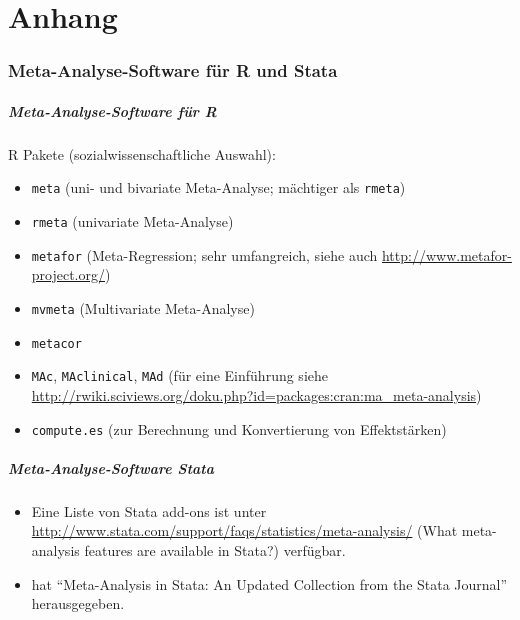 \part{Anhang}\label{part:anhang}
\frame{\partpage}



\section{Meta-Analyse-Software für R und Stata}

\begin{frame}\frametitle{Meta-Analyse-Software für R}
  R Pakete (sozialwissenschaftliche Auswahl):
  \begin{itemize}
  \item \texttt{meta} (uni- und bivariate Meta-Analyse; mächtiger als \texttt{rmeta})
  \item \texttt{rmeta} (univariate Meta-Analyse)
  \item \texttt{metafor} (Meta-Regression; sehr umfangreich, siehe auch \url{http://www.metafor-project.org/})
  \item \texttt{mvmeta} (Multivariate Meta-Analyse)
  \item \texttt{metacor}
  \item \texttt{MAc}, \texttt{MAclinical}, \texttt{MAd} (für eine Einführung
    siehe
    \url{http://rwiki.sciviews.org/doku.php?id=packages:cran:ma_meta-analysis})
  \item \texttt{compute.es} (zur Berechnung und Konvertierung von Effektstärken)
  \end{itemize}
\end{frame}



\begin{frame}\frametitle{Meta-Analyse-Software Stata}

  \begin{itemize}
  \item Eine Liste von Stata add-ons ist unter
    \url{http://www.stata.com/support/faqs/statistics/meta-analysis/} (What
    meta-analysis features are available in Stata?) verfügbar.
  \item \citet{sterne_meta-analysis_2009} hat \enquote{Meta-Analysis in Stata:
      An Updated Collection from the Stata Journal} herausgegeben.
  \end{itemize}
\end{frame}




